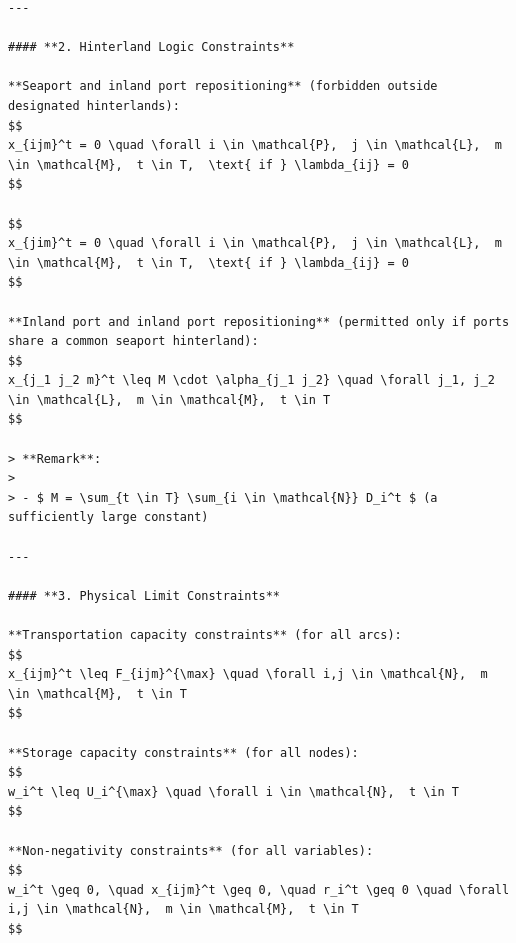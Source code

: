 \documentclass[preprint,12pt]{elsarticle}
\begin{document}
\begin{nolinenumbers}
\begin{promptbox}
\begin{lstlisting}[style=prompttemplate]
---

#### **2. Hinterland Logic Constraints**

**Seaport and inland port repositioning** (forbidden outside designated hinterlands):
$$
x_{ijm}^t = 0 \quad \forall i \in \mathcal{P},  j \in \mathcal{L},  m \in \mathcal{M},  t \in T,  \text{ if } \lambda_{ij} = 0
$$

$$
x_{jim}^t = 0 \quad \forall i \in \mathcal{P},  j \in \mathcal{L},  m \in \mathcal{M},  t \in T,  \text{ if } \lambda_{ij} = 0
$$

**Inland port and inland port repositioning** (permitted only if ports share a common seaport hinterland):
$$
x_{j_1 j_2 m}^t \leq M \cdot \alpha_{j_1 j_2} \quad \forall j_1, j_2 \in \mathcal{L},  m \in \mathcal{M},  t \in T
$$

> **Remark**:
>
> - $ M = \sum_{t \in T} \sum_{i \in \mathcal{N}} D_i^t $ (a sufficiently large constant)

---

#### **3. Physical Limit Constraints**

**Transportation capacity constraints** (for all arcs):
$$
x_{ijm}^t \leq F_{ijm}^{\max} \quad \forall i,j \in \mathcal{N},  m \in \mathcal{M},  t \in T
$$

**Storage capacity constraints** (for all nodes):
$$
w_i^t \leq U_i^{\max} \quad \forall i \in \mathcal{N},  t \in T
$$

**Non-negativity constraints** (for all variables):
$$
w_i^t \geq 0, \quad x_{ijm}^t \geq 0, \quad r_i^t \geq 0 \quad \forall i,j \in \mathcal{N},  m \in \mathcal{M},  t \in T
$$

\end{lstlisting}
\end{promptbox}
\label{lst:ecr-mathematical-model}
\end{nolinenumbers}
\newpage











\end{document}
